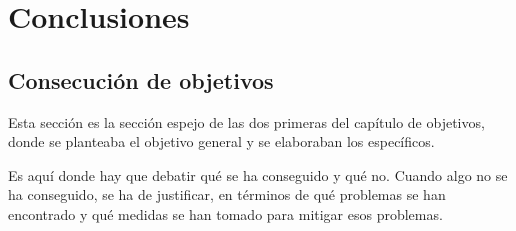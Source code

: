\documentclass[a4paper, 12pt]{book}
\begin{document}









\cleardoublepage
\chapter{Conclusiones}
\label{chap:conclusiones}


\section{Consecución de objetivos}
\label{sec:consecucion-objetivos}

Esta sección es la sección espejo de las dos primeras del capítulo de objetivos, donde se planteaba el objetivo general y se elaboraban los específicos.

Es aquí donde hay que debatir qué se ha conseguido y qué no. 
Cuando algo no se ha conseguido, se ha de justificar, en términos de qué problemas se han encontrado y qué medidas se han tomado para mitigar esos problemas.
\end{document}
